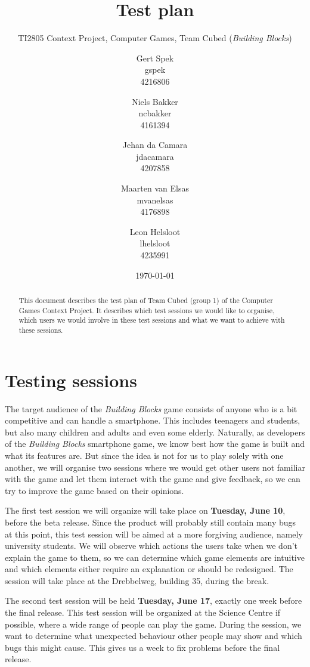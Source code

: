 \documentclass[a4paper,titlepage]{scrartcl}
\title{Test plan}
\subtitle{TI2805 Context Project, Computer Games, Team Cubed (\textit{Building Blocks})}
\author{Gert Spek \\ gspek \\ 4216806 \and Niels Bakker \\ ncbakker \\ 4161394 \and Jehan da Camara \\ jdacamara \\ 4207858 \and Maarten van Elsas \\ mvanelsas \\ 4176898 \and Leon Helsloot \\ lhelsloot \\ 4235991}
\date{\today}
\begin{document}
\maketitle

\begin{abstract}
This document describes the test plan of Team Cubed (group 1) of the Computer Games Context Project. It describes which test sessions we would like to organise, which users we would involve in these test sessions and what we want to achieve with these sessions.
\end{abstract}

\newpage
\tableofcontents

\section{Testing sessions}
The target audience of the \textit{Building Blocks} game consists of anyone who is a bit competitive and can handle a smartphone. This includes teenagers and students, but also many children and adults and even some elderly. Naturally, as developers of the \textit{Building Blocks} smartphone game, we know best how the game is built and what its features are. But since the idea is not for us to play solely with one another, we will organise two sessions where we would get other users not familiar with the game and let them interact with the game and give feedback, so we can try to improve the game based on their opinions.

The first test session we will organize will take place on \textbf{Tuesday, June 10}, before the beta release. Since the product will probably still contain many bugs at this point, this test session will be aimed at a more forgiving audience, namely university students. We will observe which actions the users take when we don't explain the game to them, so we can determine which game elements are intuitive and which elements either require an explanation or should be redesigned. The session will take place at the Drebbelweg, building 35, during the break.

The second test session will be held \textbf{Tuesday, June 17}, exactly one week before the final release. This test session will be organized at the Science Centre if possible, where a wide range of people can play the game. During the session, we want to determine what unexpected behaviour other people may show and which bugs this might cause. This gives us a week to fix problems before the final release.
\end{document}
